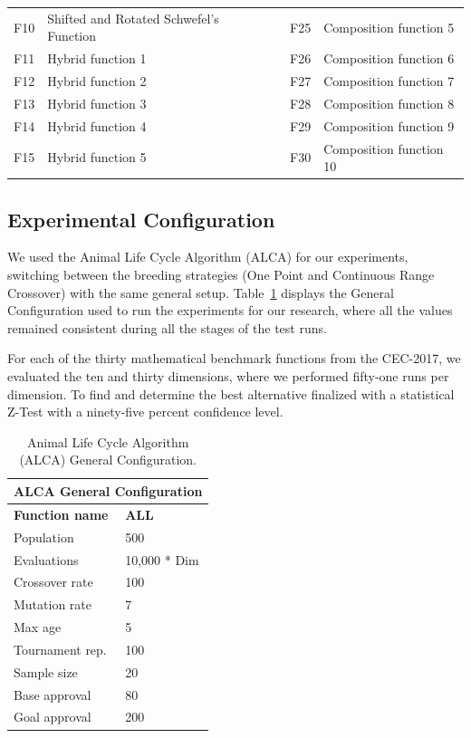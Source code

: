 \documentclass[graybox]{svmult}
\begin{document}
\begin{table}[]
\begin{tabular}{@{}cllcl@{}}
    F10 & Shifted and Rotated   Schwefel's Function &  & F25 & Composition function   5 \\
    F11 & Hybrid function 1 &  & F26 & Composition function   6 \\
    F12 & Hybrid function 2 &  & F27 & Composition function   7 \\
    F13 & Hybrid function 3 &  & F28 & Composition function   8 \\
    F14 & Hybrid function 4 &  & F29 & Composition function   9 \\
    F15 & Hybrid function 5 &  & F30 & Composition function   10 \\ \bottomrule
    \end{tabular}
    \end{table}


    \subsection{Experimental Configuration}

    We used the Animal Life Cycle Algorithm (ALCA) for our experiments, switching between the breeding strategies (One Point and Continuous Range Crossover) with the same general setup. Table~\ref{tab.general_configuration} displays the General Configuration used to run the experiments for our research, where all the values remained consistent during all the stages of the test runs.

    For each of the thirty mathematical benchmark functions from the CEC-2017, we evaluated the ten and thirty dimensions, where we performed fifty-one runs per dimension. To find and determine the best alternative finalized with a statistical Z-Test with a ninety-five percent confidence level.

    \begin{table}[]
    \scriptsize
    \centering
    \caption{Animal Life Cycle Algorithm (ALCA) General Configuration.}\label{tab.general_configuration}    
    \begin{tabular}{@{}ll@{}}
    \toprule
    \multicolumn{2}{l}{\textbf{ALCA   General Configuration}} \\ \midrule
    \textbf{Function name} & \textbf{ALL} \\
    Population & 500 \\
    Evaluations & 10,000 * Dim \\
    Crossover rate & 100 \\
    Mutation rate & 7 \\
    Max age & 5 \\
    Tournament rep. & 100 \\
    Sample size & 20 \\
    Base approval & 80 \\
    Goal approval & 200 \\ \bottomrule
    \end{tabular}
    \end{table}
\end{document}
